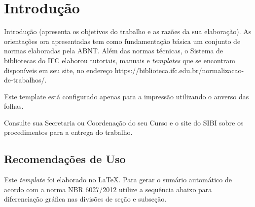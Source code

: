 \chapter{Introdução}

Introdução (apresenta os objetivos do trabalho e as razões da sua elaboração).
As orientações ora apresentadas tem como fundamentação básica um conjunto de normas elaboradas pela ABNT. Além das normas técnicas, o Sistema de bibliotecas do IFC elaborou tutoriais, manuais e \textit{templates} que se encontram disponíveis em seu site, no endereço https://biblioteca.ifc.edu.br/normalizacao-de-trabalhos/.

Este template está configurado apenas para a impressão utilizando o anverso das folhas.

Consulte sua Secretaria ou Coordenação do seu Curso e o site do SIBI sobre os procedimentos para a entrega do trabalho.

\section{Recomendações de Uso}
Este \textit{template} foi elaborado no \LaTeX . Para gerar o sumário automático de acordo com a norma NBR 6027/2012 utilize a sequência abaixo para diferenciação gráfica nas divisões de seção e subseção.

